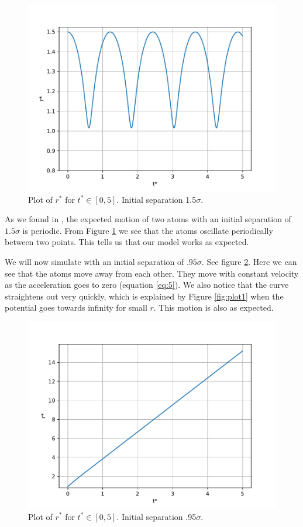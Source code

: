 \documentclass[a4paper,10pt,english]{article}
\begin{document}
\begin{figure}[h!] 
    \centering 
    \includegraphics[scale=.65]{../figures/2_b_ii.pdf} 
    \caption{Plot of $r^*$ for $t^*\in[0, 5]$. Initial separation 1.5$\sigma$.}
    \label{fig:plot2}
\end{figure}

As we found in \textit{}, the expected motion of two atoms with an initial separation of $1.5\sigma$ is periodic. From Figure \ref{fig:plot2} we see that the atoms oscillate periodically between two points. This tells us that our model works as expected.

We will now simulate with an initial separation of $.95\sigma$. See figure \ref{fig:plot3}. Here we can see that the atoms move away from each other. They move with constant velocity as the acceleration goes to zero (equation \ref{eq:5}). We also notice that the curve straightens out very quickly, which is explained by Figure \ref{fig:plot1} when the potential goes towards infinity for small $r$. This motion is also as expected. 

\begin{figure}[h!]
    \centering 
    \includegraphics[scale=.65]{../figures/2_b_iv.pdf} 
    \caption{Plot of $r^*$ for $t^*\in[0, 5]$. Initial separation .95$\sigma$.}
    \label{fig:plot3}
\end{figure}
\end{document}
